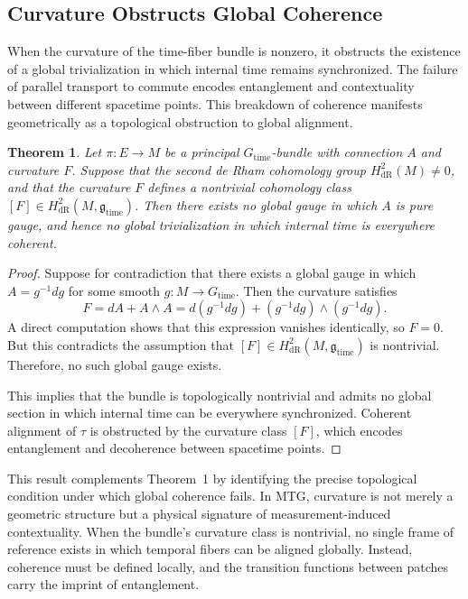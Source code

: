 \documentclass[11pt]{article}
\newtheorem{theorem}{Theorem}
\begin{document}
\subsection{Curvature Obstructs Global Coherence}
When the curvature of the time-fiber bundle is nonzero, it obstructs the existence of a global trivialization in which internal time remains synchronized. The failure of parallel transport to commute encodes entanglement and contextuality between different spacetime points. This breakdown of coherence manifests geometrically as a topological obstruction to global alignment.

\begin{theorem}\label{thm:curvature_obstruction}
Let \( \pi: E \to M \) be a principal \( G_{\text{time}} \)-bundle with connection \( A \) and curvature \( F \). Suppose that the second de Rham cohomology group \( H^2_{\text{dR}}(M) \neq 0 \), and that the curvature \( F \) defines a nontrivial cohomology class \( [F] \in H^2_{\text{dR}}(M, \mathfrak{g}_{\text{time}}) \). Then there exists no global gauge in which \( A \) is pure gauge, and hence no global trivialization in which internal time is everywhere coherent.
\end{theorem}

\begin{proof}
Suppose for contradiction that there exists a global gauge in which \( A = g^{-1} d g \) for some smooth \( g: M \to G_{\text{time}} \). Then the curvature satisfies
\begin{equation}
F = dA + A \wedge A = d(g^{-1} d g) + (g^{-1} d g) \wedge (g^{-1} d g).
\end{equation}
A direct computation shows that this expression vanishes identically, so \( F = 0 \). But this contradicts the assumption that \( [F] \in H^2_{\text{dR}}(M, \mathfrak{g}_{\text{time}}) \) is nontrivial. Therefore, no such global gauge exists.

This implies that the bundle is topologically nontrivial and admits no global section in which internal time can be everywhere synchronized. Coherent alignment of \( \tau \) is obstructed by the curvature class \( [F] \), which encodes entanglement and decoherence between spacetime points.
\end{proof}

This result complements Theorem~1 by identifying the precise topological condition under which global coherence fails. In MTG, curvature is not merely a geometric structure but a physical signature of measurement-induced contextuality. When the bundle's curvature class is nontrivial, no single frame of reference exists in which temporal fibers can be aligned globally. Instead, coherence must be defined locally, and the transition functions between patches carry the imprint of entanglement.
\end{document}
